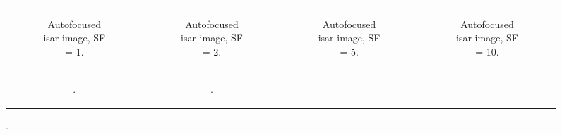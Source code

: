 \documentclass[class=report,11pt,crop=false]{standalone}
\begin{document}
    \begin{figure}[h]
    \begin{minipage}{0.98\linewidth}
        \begin{tabular}{@{}cccc@{}}
            \begin{subfigure}{0.25\linewidth}
                \centering
                \resizebox{\linewidth}{!}{}
                \caption{Autofocused \gls{isar} image, SF = 1.\label{subfig:sf1_corrRA_isar}}
            \end{subfigure}
            &
            \begin{subfigure}{0.25\linewidth}
                \centering
                \resizebox{\linewidth}{!}{}
                \caption{Autofocused \gls{isar} image, SF = 2.\label{subfig:sf2_corrRA_isar}}
            \end{subfigure}
            &
            \begin{subfigure}{0.25\linewidth}
                \centering
                \resizebox{\linewidth}{!}{}
                \caption{Autofocused \gls{isar} image, SF = 5.\label{subfig:sf5_corrRA_isar}}
            \end{subfigure}
             &
            \begin{subfigure}{0.25\linewidth}
                \centering
                \resizebox{\linewidth}{!}{}
                \caption{Autofocused \gls{isar} image, SF = 10.\label{subfig:sf10_corrRA_isar}}
            \end{subfigure}
            \\
            \begin{subfigure}{0.25\linewidth}
                \centering
                \resizebox{\linewidth}{!}{}
                \caption{.\label{subfig:hayRA_sim_hrrp}}
            \end{subfigure}
             &
            \begin{subfigure}{0.25\linewidth}
                \centering
                \resizebox{\linewidth}{!}{}
                \caption{.\label{subfig:hayRA_sim_hrrp}}
            \end{subfigure}

\end{tabular}
\end{minipage}
\end{figure}
\end{document}
